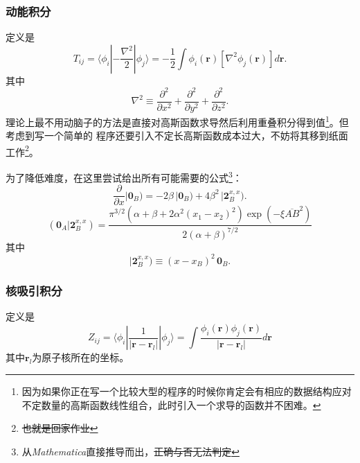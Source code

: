 \documentclass[12pt,a4paper,openany,twoside]{article}
\numberwithin{equation}{section}
\begin{document}
                
                \subsubsection{动能积分}
                定义是
                \begin{equation}
                    T_{ij} = \langle \phi_i | - \frac{\nabla ^ 2}{2} | \phi_j \rangle = -\frac{1}{2}\int \phi_i(\boldsymbol{r})[ \nabla^2 \phi_j(\boldsymbol{r}) ]d \boldsymbol{r}.
                \end{equation}
                其中
                \begin{equation}
                    \nabla^2 \equiv \frac{\partial^2}{\partial x^2} + \frac{\partial^2}{\partial y^2} + \frac{\partial^2}{\partial z^2}.
                \end{equation}
                理论上最不用动脑子的方法是直接对高斯函数求导然后利用重叠积分得到值\footnote{因为如果你正在写一个比较大型的程序的时候你肯定会有相应的数据结构应对不定数量的高斯函数线性组合，此时引入一个求导的函数并不困难。}。但考虑到写一个简单的  程序还要引入不定长高斯函数成本过大，不妨将其移到纸面工作\footnote{\sout{也就是回家作业}}。

                为了降低难度，在这里尝试给出所有可能需要的公式\footnote{从\emph{Mathematica}直接推导而出，\sout{正确与否无法判定}}：
                \begin{equation}
                    \frac{\partial}{\partial x} |\boldsymbol{0}_B) = - 2 \beta \, |\boldsymbol{0}_B) + 4 \beta^2 \, |\boldsymbol{2}^{x,x}_B).
                \end{equation}
                \begin{equation}
                    (\boldsymbol{0}_A|\boldsymbol{2}^{x,x}_B) = \frac{\pi ^{3/2} \left(\alpha+\beta +2 \alpha ^2 (x_1-x_2)^2 \right)\exp \left(-\xi \overline{AB}^2\right)}{2 (\alpha+\beta )^{7/2}}
                \end{equation}
                其中
                \begin{equation}
                    |\boldsymbol{2}^{x,x}_B) \equiv (x - x_B)^2 \, \boldsymbol{0}_B.
                \end{equation}


                \subsubsection{核吸引积分}
                定义是
                \begin{equation}
                    Z_{ij} = \langle \phi_i | \frac{1}{|\boldsymbol{r} - \boldsymbol{r}_l|} |\phi_j \rangle = \int \frac{\phi_i(\boldsymbol{r}) \phi_j(\boldsymbol{r})}{|\boldsymbol{r} - \boldsymbol{r}_l|} d \boldsymbol{r} 
                \end{equation}
                其中$\boldsymbol{r}_l$为原子核所在的坐标。
\end{document}
